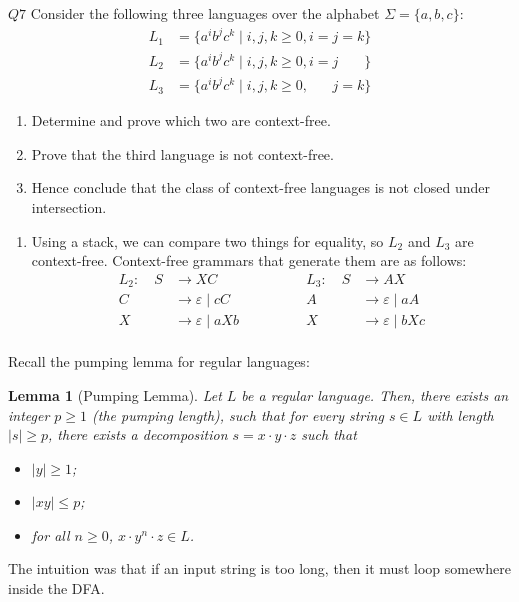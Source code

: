 \documentclass{article}
\newtheorem*{lemma*}{Lemma}
\theoremstyle{definition}
\theoremstyle{definition}
\theoremstyle{remark}
\begin{document}
\begin{questionbox}{$Q7$}
    Consider the following three languages over the alphabet $\Sigma=\{a,b,c\}$:
    \begin{align*}
        L_1&=\{a^ib^jc^k\mid i,j,k\geq0,i=j=k\}\\
        L_2&=\{a^ib^jc^k\mid i,j,k\geq0,i=j\phantom{{}=k}\}\\
        L_3&=\{a^ib^jc^k\mid i,j,k\geq0,\phantom{i={}}j=k\}
    \end{align*}
    \begin{enumerate}
        \item[$(i)$] Determine and prove which two are context-free.
        
        \item[$(ii)$] Prove that the third language is not context-free.
    
        \item[$(iii)$] Hence conclude that the class of context-free languages is not closed under intersection.
    \end{enumerate}
\end{questionbox}

\bigskip

\begin{enumerate}
    \item[$(i)$] Using a stack, we can compare two things for equality, so $L_2$ and $L_3$ are context-free. Context-free grammars that generate them are as follows:
    \begin{equation*}
        \begin{aligned}
            L_2:\quad S&\rightarrow XC\\
            C&\rightarrow\varepsilon\mid cC\\
            X&\rightarrow\varepsilon\mid aXb\\
        \end{aligned}\qquad\qquad
        \begin{aligned}
            L_3:\quad S&\rightarrow AX\\
            A&\rightarrow\varepsilon\mid aA\\
            X&\rightarrow\varepsilon\mid bXc\\
        \end{aligned}
    \end{equation*}
\end{enumerate}


Recall the pumping lemma for regular languages:
\begin{lemma*}[Pumping Lemma]
    Let $L$ be a regular language. Then, there exists an integer $p\geq 1$ (the \textit{pumping length}), such that for every string $s\in L$ with length $|s|\geq p$, there exists a decomposition $s=x\cdot y\cdot z$ such that
    \begin{itemize}
        \item $|y|\geq1$;
        \item $|xy|\leq p$;
        \item for all $n\geq0$, $x\cdot y^n\cdot z\in L$.
    \end{itemize}
\end{lemma*}
The intuition was that if an input string is too long, then it must loop somewhere inside the DFA.
\end{document}
